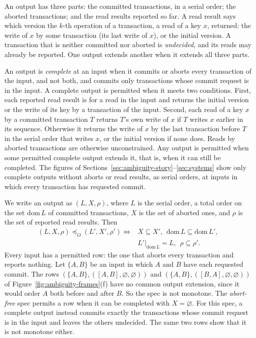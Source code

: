 \documentclass[sigconf]{cidr-2027}
\theoremstyle{remark}
\newcommand{\OutputOrd}{\preceq_O}
\newcommand{\outrel}{extends\xspace}          %
\newcommand{\outnoun}{output extension\xspace}%
\begin{document}
An output has three parts: the committed transactions, in a serial order; the
aborted transactions; and the read results reported so far. A read result
says which version the $k$-th operation of a transaction, a read of a key $x$,
returned: the write of $x$ by some transaction (its last write of $x$), or the
initial version. A transaction that is
neither committed nor aborted is \emph{undecided}, and its reads may already be
reported. One output \outrel another when it extends all three parts.

An output is \emph{complete} at an input when it commits or aborts every
transaction of the input, and not both, and commits only transactions whose
commit request is in the input. A complete output is permitted when it meets two
conditions. First, each reported read result is for a read in the input and
returns the initial version or the write of its key by a transaction of the
input. Second, each read of a key $x$ by a committed transaction $T$ returns
$T$'s own write of $x$ if $T$ writes $x$ earlier in its sequence. Otherwise it
returns the write of $x$ by the last transaction before $T$ in the serial order
that writes $x$, or the initial version if none does. Reads by aborted
transactions are otherwise unconstrained. Any output is permitted when some permitted complete output
\outrel it, that is, when it can still be completed. The figures of
Sections~\ref{sec:ambiguity-story}--\ref{sec:systems} show only complete
outputs without aborts or read results, as serial orders, at inputs in which
every transaction has requested commit.

We write an output as $(L,X,\rho)$, where $L$ is the serial order, a total
order on the set $\mathrm{dom}\,L$ of committed transactions, $X$ is the set of
aborted ones, and $\rho$ is the set of reported read results. Then
\[
  \begin{aligned}
  (L,X,\rho)\OutputOrd(L',X',\rho')
  \iff{}& X\subseteq X',\ \ \mathrm{dom}\,L\subseteq\mathrm{dom}\,L',\\
         & L'|_{\mathrm{dom}\,L}=L,\ \ \rho\subseteq\rho'.
  \end{aligned}
\]
Every input has a permitted row: the one that aborts every transaction and
reports nothing. Let $\{A,B\}$ be an input in which $A$ and $B$ have each
requested commit. The rows $(\{A,B\},([A,B],\varnothing,\varnothing))$ and
$(\{A,B\},([B,A],\varnothing,\varnothing))$ of
Figure~\ref{fig:ambiguity-frames}(f) have no common \outnoun, since it would
order $A$ both before and after $B$. So the spec is not monotone. The
\emph{abort-free} spec permits a row when it can be completed with
$X=\varnothing$. For this spec, a complete output instead commits exactly the
transactions whose commit request is in the input and leaves the others
undecided. The same two rows show that it is not monotone either.
\end{document}
